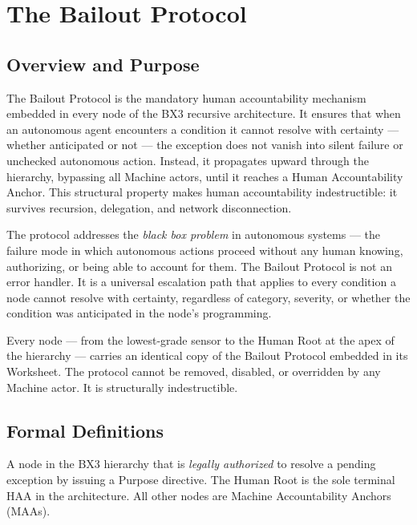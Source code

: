 \section{The Bailout Protocol}
\label{sec:bailout-protocol}

\subsection{Overview and Purpose}

The Bailout Protocol is the mandatory human accountability mechanism embedded in every node of the BX3 recursive architecture. It ensures that when an autonomous agent encounters a condition it cannot resolve with certainty — whether anticipated or not — the exception does not vanish into silent failure or unchecked autonomous action. Instead, it propagates upward through the hierarchy, bypassing all Machine actors, until it reaches a Human Accountability Anchor. This structural property makes human accountability indestructible: it survives recursion, delegation, and network disconnection.

The protocol addresses the \emph{black box problem} in autonomous systems — the failure mode in which autonomous actions proceed without any human knowing, authorizing, or being able to account for them. The Bailout Protocol is not an error handler. It is a universal escalation path that applies to every condition a node cannot resolve with certainty, regardless of category, severity, or whether the condition was anticipated in the node's programming.

Every node — from the lowest-grade sensor to the Human Root at the apex of the hierarchy — carries an identical copy of the Bailout Protocol embedded in its Worksheet. The protocol cannot be removed, disabled, or overridden by any Machine actor. It is structurally indestructible.

\subsection{Formal Definitions}

\begin{definition}
A node in the BX3 hierarchy that is \emph{legally authorized} to resolve a pending exception by issuing a Purpose directive. The Human Root is the sole terminal HAA in the architecture. All other nodes are Machine Accountability Anchors (MAAs).
\end{definition}

